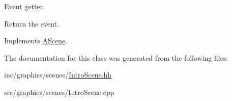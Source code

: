 Event getter. 

Return the event. 

Implements \hyperlink{classAScene_af521e5e6d30a5d2e5d30eb333e4d3abd}{A\+Scene}.



The documentation for this class was generated from the following files\+:\begin{DoxyCompactItemize}
\item 
inc/graphics/scenes/\hyperlink{IntroScene_8hh}{Intro\+Scene.\+hh}\item 
src/graphics/scenes/Intro\+Scene.\+cpp\end{DoxyCompactItemize}
